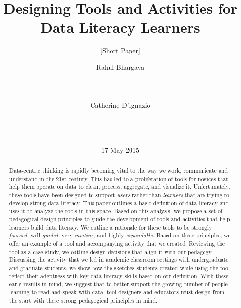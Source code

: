\documentclass{acm_proc_article-sp}
\begin{document}
\title{Designing Tools and Activities for Data Literacy Learners}
\subtitle{[Short Paper]}

\author{
\alignauthor
Rahul Bhargava\\
       \\
       \\
       \\
\alignauthor
Catherine D'Ignazio\\
       \\
       \\
       \\
}

\date{17 May 2015}

\maketitle
\begin{abstract}
Data-centric thinking is rapidly becoming vital to the way we work, communicate and understand in the 21st century. This has led to a proliferation of tools for novices that help them operate on data to clean, process, aggregate, and visualize it. Unfortunately, these tools have been designed to support \emph{users} rather than \emph{learners} that are trying to develop strong data literacy. This paper outlines a basic definition of data literacy and uses it to analyze the tools in this space. Based on this analysis, we propose a set of pedagogical design principles to guide the development of tools and activities that help learners build data literacy. We outline a rationale for these tools to be strongly \emph{focused}, well \emph{guided}, very \emph{inviting}, and highly \emph{expandable}. Based on these principles, we offer an example of a tool and accompanying activity that we created. Reviewing the tool as a case study, we outline design decisions that align it with our pedagogy. Discussing the activity that we led in academic classroom settings with undergraduate and graduate students, we show how the sketches students created while using the tool reflect their adeptness with key data literacy skills based on our definition.  With these early results in mind, we suggest that to better support the growing number of people learning to read and speak with data, tool designers and educators must design from the start with these strong pedagogical principles in mind.
\end{abstract}
\end{document}
